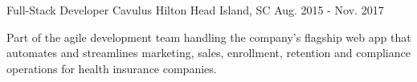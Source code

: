 \begin{cventries}
  \cventry
    {Full-Stack Developer} %
    {Cavulus} %
    {Hilton Head Island, SC} %
    {Aug. 2015 - Nov. 2017} %
    {
      \begin{cvitems} %
        \item {Part of the agile development team handling the company's flagship web app that automates and streamlines marketing, sales, enrollment, retention and compliance operations for health insurance companies.}

\end{cvitems}}
\end{cventries}
